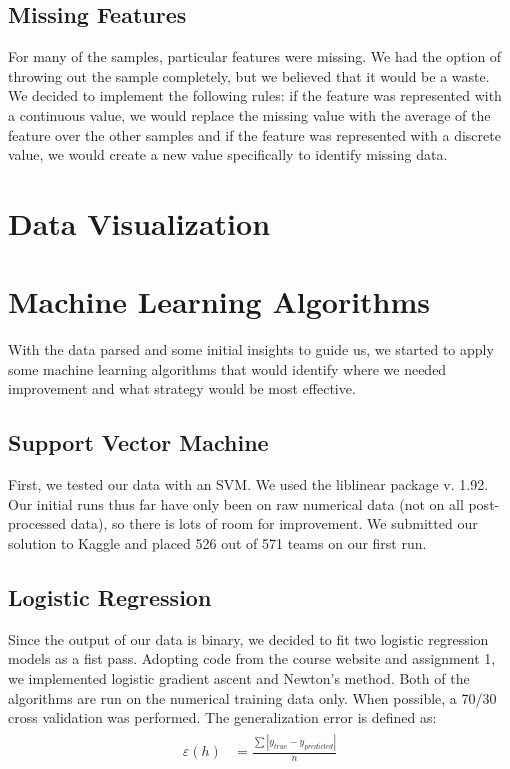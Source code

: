\documentclass[paper=letter, fontsize=11pt]{scrartcl} %
\numberwithin{equation}{section} %
\begin{document}
\subsection{Missing Features}
	For many of the samples, particular features were missing. We had the option of throwing out the sample completely, but we believed that it would be a waste. We decided to implement the following rules: if the feature was represented with a continuous value, we would replace the missing value with the average of the feature over the other samples and if the feature was represented with a discrete value, we would create a new value specifically to identify missing data.

\section{Data Visualization}

\begin{comment}
\begin{figure}[!ht]
  \centering
	\includegraphics[width=0.8\columnwidth] %
		{figures/dielectriconfabricdimension.pdf}
	\caption{.}
\end{figure}
\end{comment}

\section{Machine Learning Algorithms}
	With the data parsed and some initial insights to guide us, we started to apply some machine learning algorithms that would identify where we needed improvement and what strategy would be most effective.

\subsection{Support Vector Machine}
	First, we tested our data with an SVM. We used the liblinear package v. 1.92. Our initial runs thus far have only been on raw numerical data (not on all post-processed data), so there is lots of room for improvement. We submitted our solution to Kaggle and placed 526 out of 571 teams on our first run.

\subsection{Logistic Regression}
	Since the output of our data is binary, we decided to fit two logistic regression models as a fist pass. Adopting code from the course website and assignment 1, we implemented logistic gradient ascent and Newton's method. Both of the algorithms are run on the numerical training data only. When possible, a 70/30 cross validation was performed. The generalization error is defined as:
\begin{align} 
\begin{split}
\varepsilon(h) &= \frac{\sum|y_{true} - y_{predicted}|}{n} \\
\end{split}					
\end{align}
\end{document}
